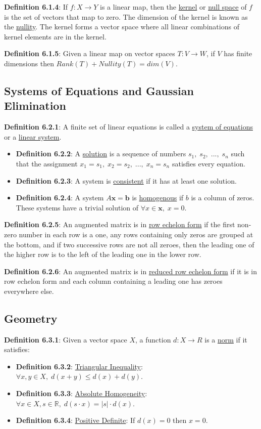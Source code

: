 \documentclass{article}
\newcommand{\separate}[1] {\vspace{#1 pt}\noindent}
\newcommand{\R}{\mathbb{R}}
\newcommand{\definition}[2]{\textbf{Definition #1}: #2\label{def:#1}}
\begin{document}
\separate{7}\definition{6.1.4}{If \(f:X \rightarrow Y\) is a linear map, then the \underline{kernel} or \underline{null space} of \(f\) is the set of vectors that map to zero. The dimension of the kernel is known as the \underline{nullity}. The kernel forms a vector space where all linear combinations of kernel elements are in the kernel.}

\separate{7}\definition{6.1.5}{Given a linear map on vector spaces \(T:V \rightarrow W\), if \(V\) has finite dimensions then \(Rank(T) + Nullity(T) = dim(V)\).}

\subsection{Systems of Equations and Gaussian Elimination}

\definition{6.2.1}{A finite set of linear equations is called a \underline{system of equations} or a \underline{linear system}.}
\begin{itemize}
    \item \definition{6.2.2}{A \underline{solution} is a sequence of numbers \(s_1,\;s_2,\;...,\;s_n\) such that the assignment \(x_1=s_1,\;x_2=s_2,\;...,\;x_n=s_n\) satisfies every equation.}
    \item \definition{6.2.3}{A system is \underline{consistent} if it has at least one solution.}
    \item \definition{6.2.4}{A system \(A\mathbf{x}=\mathbf{b}\) is \underline{homogenous} if \(b\) is a column of zeros. These systems have a trivial solution of \(\forall x \in \mathbf{x},\; x = 0\).}
\end{itemize}

\separate{7}\definition{6.2.5}{An augmented matrix is in \underline{row echelon form} if the first non-zero number in each row is a one, any rows containing only zeros are grouped at the bottom, and if two successive rows are not all zeroes, then the leading one of the higher row is to the left of the leading one in the lower row.}

\separate{7}\definition{6.2.6}{An augmented matrix is in \underline{reduced row echelon form} if it is in row echelon form and each column containing a leading one has zeroes everywhere else.}

\subsection{Geometry}

\definition{6.3.1}{Given a vector space \(X\), a function \(d: X \rightarrow R\) is a \underline{norm} if it satisfies:}
\begin{itemize}
    \item \definition{6.3.2}{\underline{Triangular Inequality}: \(\forall x,y \in X,\; d(x+y) \leq d(x) + d(y)\).}
    \item \definition{6.3.3}{\underline{Absolute Homogeneity}: \(\forall x \in X, s \in \R,\; d(s\cdot x) = |s| \cdot d(x)\).}
    \item \definition{6.3.4}{\underline{Positive Definite}: If \(d(x) = 0\) then \(x = 0\).}
\end{itemize}
\end{document}
